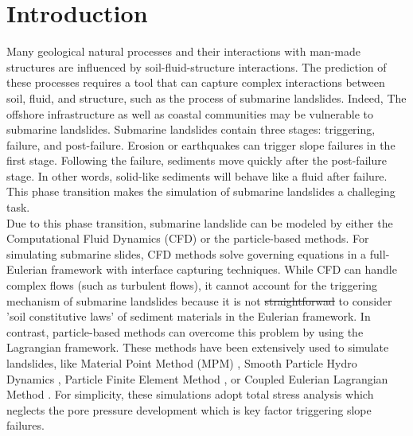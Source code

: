 \documentclass[preprint,12pt]{elsarticle}
\providecommand{\DIFadd}[1]{{\protect\color{blue}\uwave{#1}}} %
\providecommand{\DIFdel}[1]{{\protect\color{red}\sout{#1}}}                      %
\providecommand{\DIFaddbegin}{} %
\providecommand{\DIFaddend}{} %
\providecommand{\DIFdelbegin}{} %
\providecommand{\DIFdelend}{} %
\newcommand{\DIFscaledelfig}{0.5}
\newlength{\DIFdelgraphicswidth} %
\newlength{\DIFdelgraphicsheight} %
\newcommand{\DIFaddincludegraphics}[2][]{{\color{blue}\fbox{\DIFOincludegraphics[#1]{#2}}}} %
\newcommand{\DIFdelincludegraphics}[2][]{%
\sbox{\DIFdelgraphicsbox}{\DIFOincludegraphics[#1]{#2}}%
\settoboxwidth{\DIFdelgraphicswidth}{\DIFdelgraphicsbox} %
\settoboxtotalheight{\DIFdelgraphicsheight}{\DIFdelgraphicsbox} %
\scalebox{\DIFscaledelfig}{%
\parbox[b]{\DIFdelgraphicswidth}{\usebox{\DIFdelgraphicsbox}\\[-\baselineskip] \rule{\DIFdelgraphicswidth}{0em}}\llap{\resizebox{\DIFdelgraphicswidth}{\DIFdelgraphicsheight}{%
\setlength{\unitlength}{\DIFdelgraphicswidth}%
\begin{picture}(1,1)%
\thicklines\linethickness{2pt} %
{\color[rgb]{1,0,0}\put(0,0){\framebox(1,1){}}}%
{\color[rgb]{1,0,0}\put(0,0){\line( 1,1){1}}}%
{\color[rgb]{1,0,0}\put(0,1){\line(1,-1){1}}}%
\end{picture}%
}\hspace*{3pt}}} %
} %
\DeclareRobustCommand{\DIFaddbegin}{\DIFOaddbegin \let\includegraphics\DIFaddincludegraphics} %
\DeclareRobustCommand{\DIFaddend}{\DIFOaddend \let\includegraphics\DIFOincludegraphics} %
\DeclareRobustCommand{\DIFdelbegin}{\DIFOdelbegin \let\includegraphics\DIFdelincludegraphics} %
\DeclareRobustCommand{\DIFdelend}{\DIFOaddend \let\includegraphics\DIFOincludegraphics} %
\begin{document}
\newpage
%
\section{\textsf{Introduction}}

 Many geological natural processes and their interactions with man-made structures are influenced by soil-fluid-structure interactions. The prediction of these processes requires a tool that can capture complex interactions between soil, fluid, and structure, such as the process of submarine landslides. Indeed, The offshore infrastructure as well as coastal communities may be vulnerable to submarine landslides. Submarine landslides contain three stages: triggering, failure, and post-failure. Erosion or earthquakes can trigger slope failures in the first stage. Following the failure, sediments move quickly after the post-failure stage. In other words, solid-like sediments will behave like a fluid after failure. This phase transition makes the simulation of submarine landslides a challeging task.\\

Due to this phase transition, submarine landslide can be modeled by either the Computational Fluid Dynamics (CFD) or the particle-based methods. For simulating submarine slides, CFD methods solve governing equations in a full-Eulerian framework \cite{CFD1, CFD2,CFD3, CFD4} with interface capturing techniques. While CFD can handle complex flows (such as turbulent flows), it cannot account for the triggering mechanism of submarine landslides because it is not \DIFdelbegin \DIFdel{straightforwad }\DIFdelend \DIFaddbegin \DIFadd{straightforward }\DIFaddend to consider 'soil constitutive laws' of sediment materials in the Eulerian framework. In contrast, particle-based methods can overcome this problem by using the Lagrangian framework. These methods have been extensively used to simulate landslides, like Material Point Method (MPM) \cite{Tran2019}, Smooth Particle Hydro Dynamics \cite{Capone2010}, Particle Finite Element Method \cite{Zhang2019}, or Coupled Eulerian Lagrangian Method \cite{Dey2016}. For simplicity, these simulations adopt total stress analysis which neglects the pore pressure development which is key factor triggering slope failures. \\
\end{document}
